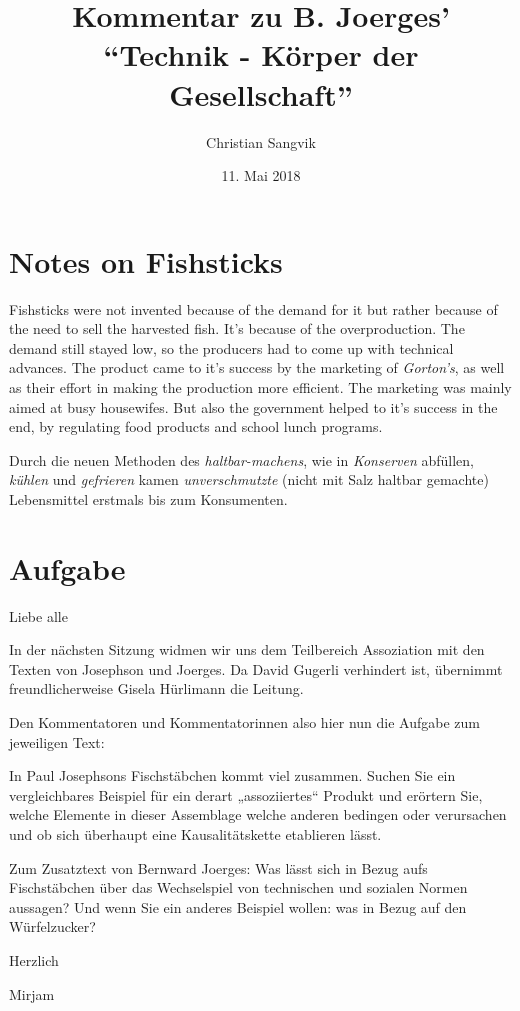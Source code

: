 \documentclass[a4paper,ngerman,11pt]{scrartcl}
\author{Christian Sangvik}
\date{11. Mai 2018}
\title{Kommentar zu B. Joerges'\\"`Technik - Körper der Gesellschaft"'}
\begin{document}
\maketitle
\noindent


\nocite{Joerges1996,Josephson2008}

\section*{Notes on Fishsticks}
\label{sec-1}

Fishsticks were not invented because of the demand for it but rather because
of the need to sell the harvested fish. It's because of the
overproduction. The demand still stayed low, so the producers had to come up
with technical advances. The product came to it's success by the marketing of
\emph{Gorton's}, as well as their effort in making the production more
efficient. The marketing was mainly aimed at busy housewifes. But also the
government helped to it's success in the end, by regulating food products and
school lunch programs.

Durch die neuen Methoden des \emph{haltbar-machens}, wie in \emph{Konserven} abfüllen,
\emph{kühlen} und \emph{gefrieren} kamen \emph{unverschmutzte} (nicht mit Salz
haltbar gemachte) Lebensmittel erstmals bis zum Konsumenten.

\section*{Aufgabe}
\label{sec-2}

Liebe alle

In der nächsten Sitzung widmen wir uns dem Teilbereich Assoziation mit den
Texten von Josephson und Joerges. Da David Gugerli verhindert ist, übernimmt
freundlicherweise Gisela Hürlimann die Leitung.

Den Kommentatoren und Kommentatorinnen also hier nun die Aufgabe zum jeweiligen
Text:

In Paul Josephsons Fischstäbchen kommt viel zusammen. Suchen Sie ein
vergleichbares Beispiel für ein derart „assoziiertes“ Produkt und erörtern Sie,
welche Elemente in dieser Assemblage welche anderen bedingen oder verursachen
und ob sich überhaupt eine Kausalitätskette etablieren lässt.

Zum Zusatztext von Bernward Joerges: Was lässt sich in Bezug aufs Fischstäbchen
über das Wechselspiel von technischen und sozialen Normen aussagen? Und wenn Sie
ein anderes Beispiel wollen: was in Bezug auf den Würfelzucker?

Herzlich

Mirjam



\end{document}

